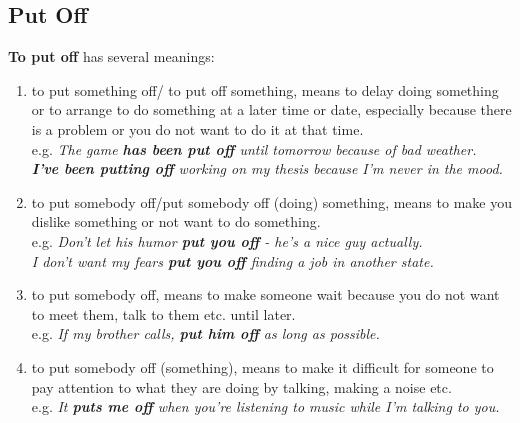 \documentclass[hidelinks,10pt,a4paper]{article}
\begin{document}
\subsection{Put Off}
\textbf{To put off} has several meanings:
\begin{enumerate}[label=(\alph*)]
	\item to put something off/ to put off something, means to delay doing something or to arrange to do something at a later time or date, especially because there is a problem or you do not want to do it at that time. \\
		e.g. \textit{The game \textbf{has been put off} until tomorrow because of bad weather. \\
		\textbf{I've been putting off} working on my thesis because I'm never in the mood. }
	\item to put somebody off/put somebody off (doing) something, means to make you dislike something or not want to do something. \\
		e.g. \textit{Don't let his humor \textbf{put you off} - he's a nice guy actually.\\
		I don't want my fears \textbf{put you off} finding a job in another state. }
	\item to put somebody off, means to make someone wait because you do not want to meet them, talk to them etc. until later. \\
		e.g. \textit{If my brother calls, \textbf{put him off} as long as possible. }
	\item to put somebody off (something), means to make it difficult for someone to pay attention to what they are doing by talking, making a noise etc. \\
		e.g. \textit{It \textbf{puts me off} when you're listening to music while I'm talking to you. }
\end{enumerate}
\end{document}
